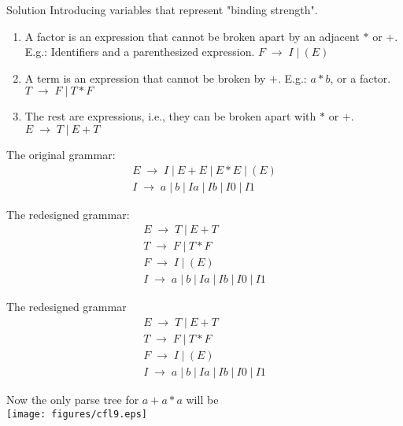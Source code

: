 \documentclass{prosper}%
\newcommand{\ra}{\mbox{$\;\rightarrow\;$}}
\newcommand{\vb}{\mbox{$\;|\:$}}
\begin{document}
\begin{slide}{Solution}
Introducing variables that represent "binding strength".
\begin{enumerate}
\item A {\blue factor} is an expression that cannot be broken apart by an adjacent $*$ or $+$. E.g.: Identifiers and a parenthesized expression. \hspace{1cm} $F\ra I\vb(E)$
\item A {\blue term} is an expression that cannot be broken by $+$. E.g.: $a * b$, or a {\blue factor}. \hspace{1cm}$T\ra F\vb T*F$
\item The rest are {\blue expressions}, i.e., they can be broken apart with $*$ or $+$. \hspace{1cm} $E\ra T\vb E+T$
\end{enumerate}
\begin{minipage}{6cm}
The original grammar:
\[
\begin{array}{l}
E \ra I \vb E + E \vb E * E \vb (E)\\
I \ra a \vb b \vb Ia \vb Ib \vb I0 \vb I1
\end{array}\]
\end{minipage}
\begin{minipage}{5cm}
The redesigned grammar:
\[
\begin{array}{l}
E \ra T \vb E+T\\
T \ra F \vb T*F\\
F \ra I \vb (E)\\
I \ra a \vb b \vb Ia \vb Ib \vb I0 \vb I1
\end{array}\]
\end{minipage}
\end{slide}

\begin{slide}{The redesigned grammar}
\[
\begin{array}{l}
E \ra T \vb E+T\\
T \ra F \vb T*F\\
F \ra I \vb (E)\\
I \ra a \vb b \vb Ia \vb Ib \vb I0 \vb I1
\end{array}\]
\begin{center}
Now the only parse tree for $a+a*a$ will be\\
\texttt{[image: figures/cfl9.eps]}
\end{center}
\end{slide}
\end{document}
